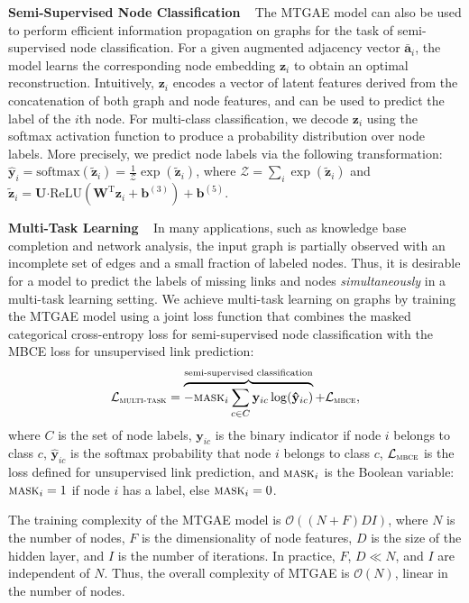 \documentclass{article}
\begin{document}
\noindent \textbf{Semi-Supervised Node Classification} ~ The MTGAE model can also be used to perform efficient information propagation on graphs for the task of semi-supervised node classification. For a given augmented adjacency vector $\mathbf{\bar{a}}_i$, the model learns the corresponding node embedding $\mathbf{z}_i$ to obtain an optimal reconstruction. Intuitively, $\mathbf{z}_i$ encodes a vector of latent features derived from the concatenation of both graph and node features, and can be used to predict the label of the $i$th node. For multi-class classification, we decode $\mathbf{z}_i$ using the softmax activation function to produce a probability distribution over node labels. More precisely, we predict node labels via the following transformation: $\mathbf{\hat{y}}_i = \text{softmax}(\mathbf{\tilde{z}}_i) = \frac{1}{\mathcal{Z}} \exp(\mathbf{\tilde{z}}_i)$, where $\mathcal{Z} = \sum_i \exp(\mathbf{\tilde{z}}_i)$ and $\mathbf{\tilde{z}}_i = \mathbf{U} \boldsymbol{\cdot} \text{ReLU}\left(\mathbf{W}^\text{T} \mathbf{z}_i + \mathbf{b}^{(3)}\right) + \mathbf{b}^{(5)}$.

\noindent \textbf{Multi-Task Learning} ~ In many applications, such as knowledge base completion and network analysis, the input graph is partially observed with an incomplete set of edges and a small fraction of labeled nodes. Thus, it is desirable for a model to predict the labels of missing links and nodes \emph{simultaneously} in a multi-task learning setting. We achieve multi-task learning on graphs by training the MTGAE model using a joint loss function that combines the masked categorical cross-entropy loss for semi-supervised node classification with the MBCE loss for unsupervised link prediction:
\begin{equation*}
\mathcal{L}_{\textsc{multi-task}} = \overbrace{- \textsc{mask}_i \sum_{c \in C}\mathbf{y}_{ic} \log (\mathbf{\hat{y}}_{ic})}^\text{semi-supervised classification} + \mathcal{L}_{\textsc{mbce}},
\end{equation*}
where $C$ is the set of node labels, $\mathbf{y}_{ic}$ is the binary indicator if node $i$ belongs to class $c$, $\mathbf{\hat{y}}_{ic}$ is the softmax probability that node $i$ belongs to class $c$, $\mathcal{L}_{\textsc{mbce}}$ is the loss defined for unsupervised link prediction, and $\textsc{mask}_i$ is the Boolean variable: $\textsc{mask}_i = 1$ if node $i$ has a label, else $\textsc{mask}_i = 0$.

The training complexity of the MTGAE model is $\mathcal{O}((N+F)DI)$, where $N$ is the number of nodes, $F$ is the dimensionality of node features, $D$ is the size of the hidden layer, and $I$ is the number of iterations. In practice, $F$, $D \ll N$, and $I$ are independent of $N$. Thus, the overall complexity of MTGAE is $\mathcal{O}(N)$, linear in the number of nodes.
\end{document}
